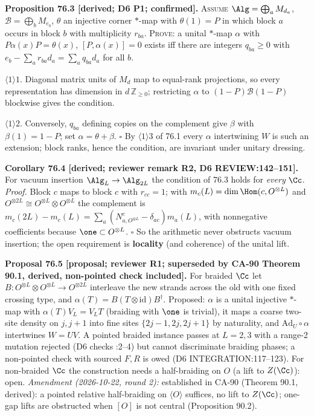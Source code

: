 \textbf{Proposition 76.3 [derived; D6 P1; confirmed].}  \textsc{Assume} \(\Alg=\bigoplus_aM_{d_a}\),
\(\mathcal B=\bigoplus_bM_{e_b}\), \(\theta\) an injective corner \(*\)-map with \(\theta(1)=P\) in which block \(a\) occurs
in block \(b\) with multiplicity \(r_{ba}\).  \textsc{Prove}: a unital \(*\)-map \(\alpha\) with \(P\alpha(x)P=\theta(x)\),
\([P,\alpha(x)]=0\) exists iff there are integers \(q_{ba}\ge0\) with \(e_b-\sum_ar_{ba}d_a=\sum_aq_{ba}d_a\) for all \(b\).
\par\(\langle1\rangle1\). Diagonal matrix units of \(M_d\) map to equal-rank projections, so every representation has
dimension in \(d\,\mathbb Z_{\ge0}\); restricting \(\alpha\) to \((1-P)\mathcal B(1-P)\) blockwise gives the condition.
\par\(\langle1\rangle2\). Conversely, \(q_{ba}\) defining copies on the complement give \(\beta\) with \(\beta(1)=1-P\);
set \(\alpha=\theta+\beta\).  \(\square\)  By \(\langle1\rangle3\) of 76.1 every \(\alpha\) intertwining \(W\) is such an
extension; block ranks, hence the condition, are invariant under unitary dressing.

\textbf{Corollary 76.4 [derived; reviewer remark R2, D6 REVIEW:142--151].}  For vacuum insertion
\(\Alg_L\to\Alg_{2L}\) the condition of 76.3 holds for \emph{every} \(\Cc\).  \emph{Proof.}  Block \(c\) maps to block
\(c\) with \(r_{cc}=1\); with \(m_c(L)=\dim\Hom(c,O^{\otimes L})\) and \(O^{\otimes2L}\cong O^{\otimes L}\otimes
O^{\otimes L}\) the complement is \(m_c(2L)-m_c(L)=\sum_a(N^c_{a,O^{\otimes L}}-\delta_{ac})m_a(L)\), with nonnegative
coefficients because \(\one\subset O^{\otimes L}\).  \(\square\)  So the arithmetic never obstructs vacuum insertion;
the open requirement is \textbf{locality} (and coherence) of the unital lift.

\textbf{Proposal 76.5 [proposal; reviewer R1; superseded by CA-90 Theorem 90.1, derived, non-pointed check included].}  For braided \(\Cc\) let
\(B:O^{\otimes L}\otimes O^{\otimes L}\to O^{\otimes2L}\) interleave the new strands across the old with one fixed
crossing type, and \(\alpha(T)=B(T\otimes\mathrm{id})B^\dagger\).  Proposed: \(\alpha\) is a unital injective \(*\)-map with
\(\alpha(T)V_L=V_LT\) (braiding with \(\one\) is trivial), it maps a coarse two-site density on \(j,j+1\) into fine sites
\(\{2j-1,2j,2j+1\}\) by naturality, and \(\mathrm{Ad}_U\circ\alpha\) intertwines \(W=UV\).  A pointed braided instance
passes at \(L=2,3\) with a range-2 mutation rejected (D6 checks :2--4) but cannot
discriminate braiding phases; a non-pointed check with sourced \(F,R\) is owed (D6 INTEGRATION:117--123).  For
non-braided \(\Cc\) the construction needs a half-braiding on \(O\) (a lift to \(Z(\Cc)\)): open.
\emph{Amendment (2026-10-22, round 2):} established in CA-90 (Theorem 90.1, derived): a pointed relative half-braiding on
\(\langle O\rangle\) suffices, no lift to \(Z(\Cc)\); one-gap lifts are obstructed when \([O]\) is not central (Proposition 90.2).

